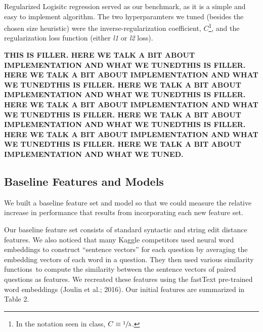 \documentclass[letterpaper, 10 pt, conference]{ieeeconf}  %
\begin{document}
Regularized Logisitc regression served as our benchmark, as it is a simple and easy to implement algorithm. The two hyperparamters we tuned (besides the chosen size heuristic) were the inverse-regularization coefficient, $C$\footnote{In the notation seen in class, $C \equiv \sfrac{1}{\lambda}$.}, and the regularization loss function (either \emph{l1} or \emph{l2} loss). 

\textbf{THIS IS FILLER. HERE WE TALK A BIT ABOUT IMPLEMENTATION AND WHAT WE TUNEDTHIS IS FILLER. HERE WE TALK A BIT ABOUT IMPLEMENTATION AND WHAT WE TUNEDTHIS IS FILLER. HERE WE TALK A BIT ABOUT IMPLEMENTATION AND WHAT WE TUNEDTHIS IS FILLER. HERE WE TALK A BIT ABOUT IMPLEMENTATION AND WHAT WE TUNEDTHIS IS FILLER. HERE WE TALK A BIT ABOUT IMPLEMENTATION AND WHAT WE TUNEDTHIS IS FILLER. HERE WE TALK A BIT ABOUT IMPLEMENTATION AND WHAT WE TUNEDTHIS IS FILLER. HERE WE TALK A BIT ABOUT IMPLEMENTATION AND WHAT WE TUNED.}


\subsection{Baseline Features and Models} 

We built a baseline feature set and model so that we could measure the relative increase in performance that results from incorporating each new feature set.

Our baseline feature set consists of standard syntactic and string edit distance features\footnotemark . We also noticed that many Kaggle competitors used neural word embeddings to construct “sentence vectors” for each question by averaging the embedding vectors of each word in a question. They then used various similarity functions\footnotemark \ to compute the similarity between the sentence vectors of paired questions as features. We recreated these features using the fastText pre-trained word embeddings (Joulin et al.; 2016). Our initial features are summarized in Table 2.
\end{document}
